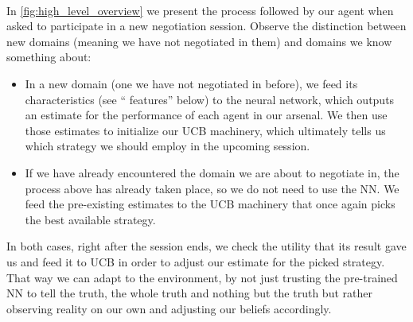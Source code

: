 \documentclass[12pt]{article}
\numberwithin{equation}{section}
\newcommand{\quotes}[1]{\textquotedblleft{} #1\textquotedblright}
\begin{document}
			\paragraph*{}
				In \cref{fig:high_level_overview} we present the process followed by our agent when asked to participate in a new negotiation session. Observe the distinction between new domains (meaning we have not negotiated in them) and domains we know something about: 
				\begin{itemize}
					\item In a new domain (one we have not negotiated in before), we feed its characteristics (see \quotes{features} below) %
					to the neural network, which outputs an estimate for the performance of each agent in our arsenal. We then use those estimates to initialize our UCB machinery, which ultimately tells us which strategy we should employ in the upcoming session.
					
					\item If we have already encountered the domain we are about to negotiate in, the process above has already taken place, so we do not need to use the NN. We feed the pre-existing estimates to the UCB machinery that once again picks the best available strategy.
				\end{itemize}
				In both cases, right after the session ends, we check the utility that its result gave us and feed it to UCB in order to adjust our estimate for the picked strategy. That way we can adapt to the environment, by not just trusting the pre-trained NN to tell the truth, the whole truth and nothing but the truth but rather observing reality on our own and adjusting our beliefs accordingly. %
\end{document}

